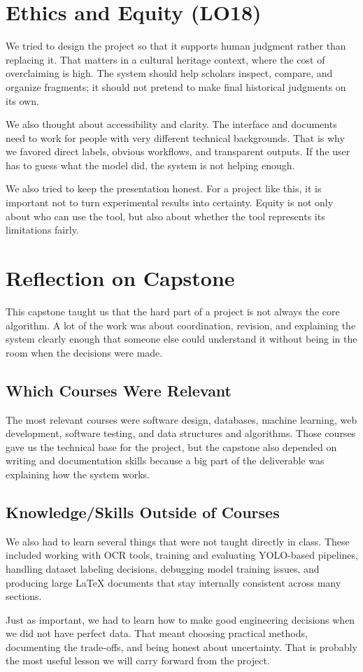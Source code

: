 \documentclass{article}
\begin{document}
\section{Ethics and Equity (LO18)}

We tried to design the project so that it supports human judgment rather than
replacing it. That matters in a cultural heritage context, where the cost of
overclaiming is high. The system should help scholars inspect, compare, and
organize fragments; it should not pretend to make final historical judgments on
its own.

We also thought about accessibility and clarity. The interface and documents need
to work for people with very different technical backgrounds. That is why we
favored direct labels, obvious workflows, and transparent outputs. If the user
has to guess what the model did, the system is not helping enough.

We also tried to keep the presentation honest. For a project like this, it is
important not to turn experimental results into certainty. Equity is not only
about who can use the tool, but also about whether the tool represents its
limitations fairly.

\section{Reflection on Capstone}

This capstone taught us that the hard part of a project is not always the core
algorithm. A lot of the work was about coordination, revision, and explaining the
system clearly enough that someone else could understand it without being in the
room when the decisions were made.

\subsection{Which Courses Were Relevant}

The most relevant courses were software design, databases, machine learning, web
development, software testing, and data structures and algorithms. Those courses
gave us the technical base for the project, but the capstone also depended on
writing and documentation skills because a big part of the deliverable was
explaining how the system works.

\subsection{Knowledge/Skills Outside of Courses}

We also had to learn several things that were not taught directly in class.
These included working with OCR tools, training and evaluating YOLO-based
pipelines, handling dataset labeling decisions, debugging model training issues,
and producing large LaTeX documents that stay internally consistent across many
sections.

Just as important, we had to learn how to make good engineering decisions when we
did not have perfect data. That meant choosing practical methods, documenting the
trade-offs, and being honest about uncertainty. That is probably the most useful
lesson we will carry forward from the project.
\end{document}
